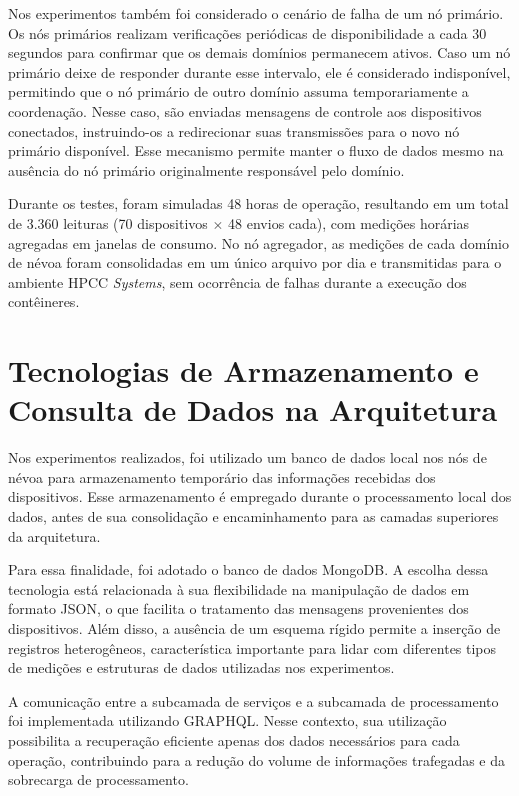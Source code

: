 Nos experimentos também foi considerado o cenário de falha de um nó primário. Os nós primários realizam verificações periódicas de disponibilidade a cada 30 segundos para confirmar que os demais domínios permanecem ativos. Caso um nó primário deixe de responder durante esse intervalo, ele é considerado indisponível, permitindo que o nó primário de outro domínio assuma temporariamente a coordenação. Nesse caso, são enviadas mensagens de controle aos dispositivos conectados, instruindo-os a redirecionar suas transmissões para o novo nó primário disponível. Esse mecanismo permite manter o fluxo de dados mesmo na ausência do nó primário originalmente responsável pelo domínio.

Durante os testes, foram simuladas 48 horas de operação, resultando em um total de 3.360 leituras (70 dispositivos $\times$ 48 envios cada), com medições horárias agregadas em janelas de consumo. No nó agregador, as medições de cada domínio de névoa foram consolidadas em um único arquivo por dia e transmitidas para o ambiente \gls{HPCC} \textit{Systems}, sem ocorrência de falhas durante a execução dos contêineres.

\section{Tecnologias de Armazenamento e Consulta de Dados na Arquitetura}

Nos experimentos realizados, foi utilizado um banco de dados local nos nós de névoa para armazenamento temporário das informações recebidas dos dispositivos. Esse armazenamento é empregado durante o processamento local dos dados, antes de sua consolidação e encaminhamento para as camadas superiores da arquitetura.

Para essa finalidade, foi adotado o banco de dados MongoDB. A escolha dessa tecnologia está relacionada à sua flexibilidade na manipulação de dados em formato \gls{JSON}, o que facilita o tratamento das mensagens provenientes dos dispositivos. Além disso, a ausência de um esquema rígido permite a inserção de registros heterogêneos, característica importante para lidar com diferentes tipos de medições e estruturas de dados utilizadas nos experimentos.

A comunicação entre a subcamada de serviços e a subcamada de processamento foi implementada utilizando \gls{GRAPHQL}. Nesse contexto, sua utilização possibilita a recuperação eficiente apenas dos dados necessários para cada operação, contribuindo para a redução do volume de informações trafegadas e da sobrecarga de processamento.


